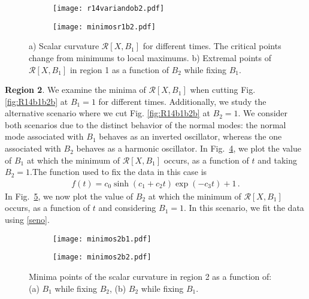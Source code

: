 \documentclass[12pt]{iopart}
\begin{document}
\begin{figure}[H]
  \centering
    \begin{subfigure}{0.45\linewidth}{\texttt{[image: r14variandob2.pdf]}}
    \caption{}
    \label{fig:r14b2a}
  \end{subfigure}
  \begin{subfigure}{0.45\linewidth}\texttt{[image: minimosr1b2.pdf]}
    \caption{}
    \label{fig:r14b2b}
    \label{fig:minimosr1b}  
  \end{subfigure}
  \captionsetup{font=small} 
  \caption{\justifying a) Scalar curvature $\mathcal{R}[X, B_1]$ for different times. The critical points change from minimums to local maximums.  b) Extremal points of $\mathcal{R}[X, B_1]$ in region 1 as a function of $B_2$ while fixing $B_1$. }  
    \label{fig:r14b2}
\end{figure}




{\bf {Region 2}}. We examine the minima of $\mathcal{R}[X, B_1]$ when cutting Fig. \ref{fig:R14b1b2b} at $B_1=1$ for different times.  Additionally, we study the alternative scenario where we cut Fig. \ref{fig:R14b1b2b} at  $B_2=1$. We consider both scenarios due to the distinct behavior of the normal modes: the normal mode associated with $B_1$ behaves as an inverted oscillator, whereas the one associated with $B_2$ behaves as a harmonic oscillator. In Fig.~\ref{fig:minimosr2a}, we plot the value of $B_1$ at which the minimum of  $\mathcal{R}[X,B_1]$ occurs, as a function of $t$ and taking $B_2=1$.The function used to fix the data in this case is
\begin{align}
    f(t)=c_0\sinh{(c_1 +c_2 t)}\exp(-c_3t)+1\,.
    \label{senohip}
\end{align}
In Fig.~\ref{fig:minimosr2b}, we now plot the value of $B_2$ at which the minimum of  $\mathcal{R}[X, B_1]$ occurs, as a function of $t$ and considering $B_1=1$. In this scenario, we fit the data using \eqref{seno}.

\begin{figure}[H]
  \centering
  \begin{subfigure}{0.45\linewidth}{\texttt{[image: minimos2b1.pdf]}}
    \caption{}
    \label{fig:minimosr2a}
  \end{subfigure}
  \begin{subfigure}{0.45\linewidth}\texttt{[image: minimos2b2.pdf]}
    \caption{}
    \label{fig:minimosr2b}  
  \end{subfigure}
  \captionsetup{font=small} 
  \caption{\justifying Minima points of the scalar curvature in region 2 as a function of: (a)  $B_1$ while fixing $B_2$, (b) $B_2$ while fixing $B_1$. }  
    \label{fig:minimosr2}
\end{figure}
\end{document}
